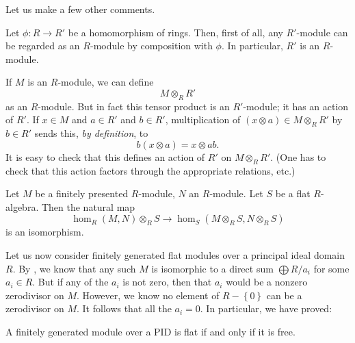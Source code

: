 Let us make a few other comments.

\begin{remark}
Let $\phi: R \to R'$ be a homomorphism of rings. Then, first of all, any
$R'$-module can be regarded as an $R$-module by composition with $\phi$. In
particular, $R'$ is an $R$-module.

If $M$ is an $R$-module, we can define
\[ M \otimes_R R'  \]
as an $R$-module. But in fact this tensor product is an $R'$-module; it has
an action of $R'$.   If $x \in M$ and $a \in R'$ and $b \in R'$, multiplication
of $(x \otimes a) \in M \otimes_R R'$ by $b \in R'$ sends this, \emph{by
definition}, to
\[ b(x \otimes a) = x \otimes ab.  \]
It is easy to check that this defines an action of $R'$ on $M \otimes_R R'$.
(One has to check that this action factors through the appropriate relations,
etc.)

\end{remark}

\begin{proposition} 
Let $M$ be a finitely presented $R$-module, $N$ an $R$-module. Let $S$ be a
flat $R$-algebra.  Then the natural map
\[ \hom_R(M,N) \otimes_R S \to \hom_S( M \otimes_R S, N \otimes_R S)  \]
is an isomorphism.
\end{proposition} 


\begin{example} 
Let us now consider finitely generated flat modules over a principal ideal
domain $R$. By , we know that any such $M$ is isomorphic to a
direct sum $\bigoplus R/a_i$ for some $a_i \in R$. But if any of the $a_i$ is
not zero, then that $a_i$ would be a nonzero zerodivisor on $M$. However, we
know no element of $R - \left\{0\right\}$ can be a zerodivisor on $M$. It
follows that all the $a_i = 0$. In particular, we have proved:

\begin{proposition} 
A finitely generated module over a PID is flat if and only if it is free.
\end{proposition} 
\end{example} 

